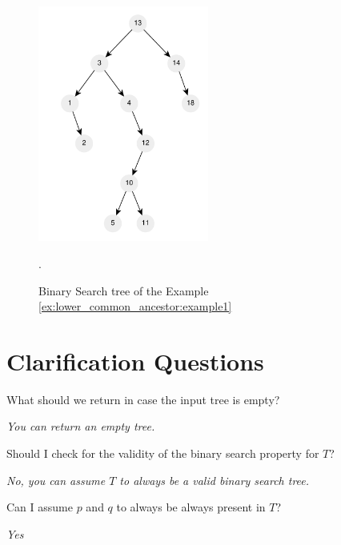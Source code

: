 \begin{figure}
	\centering
	\includegraphics[width=0.5\textwidth]{sources/lowest_common_ancestor/images/example1}
	\caption[Sample short caption]{Binary Search tree of the Example
	\ref{ex:lower_common_ancestor:example1}}.
	\label{fig:lowest_common_ancestor:example1}
\end{figure}

\section{Clarification Questions}

\begin{QandA}
	\begin{questionitem} \begin{question} What should we return in case the input tree is empty?  \end{question} 	 
    \begin{answered}
		\textit{You can return an empty tree.}
	\end{answered} \end{questionitem}


	\begin{questionitem} \begin{question} Should I check for the validity of the binary search property for $T$?  \end{question} 	 
    \begin{answered}
		\textit{No, you can assume $T$ to always be a valid binary search tree.}
	\end{answered} \end{questionitem}

	\begin{questionitem} \begin{question} Can I assume $p$ and $q$ to always be always present in $T$?  \end{question} 	 
    \begin{answered}
		\textit{Yes}
	\end{answered} \end{questionitem}

	
\end{QandA}

